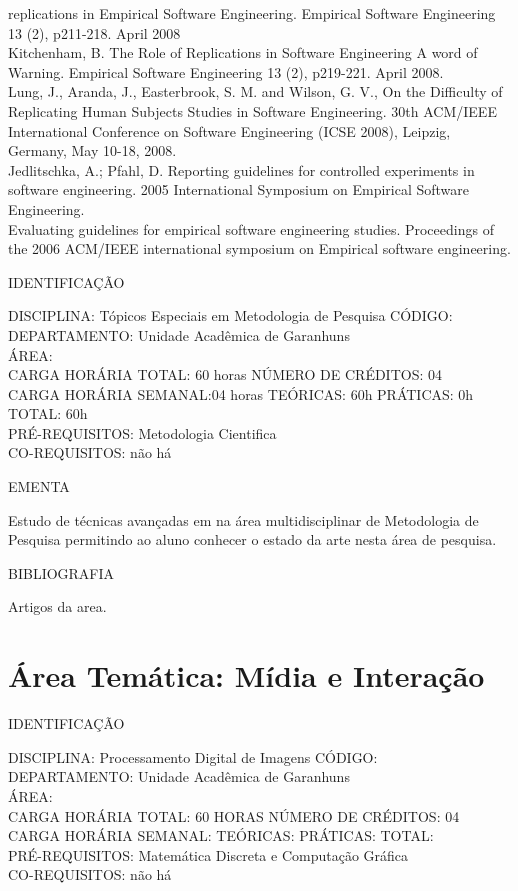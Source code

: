 \documentclass[
	12pt,				%
	openright,			%
  oneside,     %
	a4paper,			%
	chapter=TITLE,		%
	english,			%
	french,				%
	spanish,			%
	brazil				%
	]{abntex2}
\begin{document}
\begin{apendicesenv}
replications in Empirical Software Engineering. Empirical Software
Engineering 13 (2), p211-218. April 2008 \\
Kitchenham, B. The Role of Replications in Software Engineering  A
word of Warning. Empirical Software Engineering 13 (2), p219-221. April
2008.\\
Lung, J., Aranda, J., Easterbrook, S. M. and Wilson, G. V., On the
Difficulty of Replicating Human Subjects Studies in Software
Engineering. 30th ACM/IEEE International Conference on Software
Engineering (ICSE 2008), Leipzig, Germany, May 10-18,
2008.\\
Jedlitschka, A.; Pfahl, D. Reporting guidelines for controlled
experiments in software engineering. 2005 International Symposium on
Empirical Software Engineering.\\
Evaluating guidelines for empirical software engineering studies.
Proceedings of the 2006 ACM/IEEE international symposium on Empirical
software engineering.

\newpage IDENTIFICAÇÃO

DISCIPLINA: Tópicos Especiais em Metodologia de Pesquisa CÓDIGO: \\
DEPARTAMENTO: Unidade Acadêmica de Garanhuns \\
ÁREA: \\
CARGA HORÁRIA TOTAL: 60 horas NÚMERO DE CRÉDITOS: 04\\
CARGA HORÁRIA SEMANAL:04 horas TEÓRICAS: 60h PRÁTICAS: 0h TOTAL: 60h\\
PRÉ-REQUISITOS: Metodologia Cientifica\\
CO-REQUISITOS: não há

EMENTA 

Estudo de técnicas avançadas em na área multidisciplinar de Metodologia
de Pesquisa permitindo ao aluno conhecer o estado da arte nesta área de
pesquisa.

BIBLIOGRAFIA 

Artigos da area.
\newpage

\section*{Área Temática: Mídia e Interação}

IDENTIFICAÇÃO

DISCIPLINA: Processamento Digital de Imagens CÓDIGO:\\ 
DEPARTAMENTO: Unidade Acadêmica de Garanhuns\\
ÁREA: \\
CARGA HORÁRIA TOTAL: 60 HORAS NÚMERO DE CRÉDITOS: 04\\
CARGA HORÁRIA SEMANAL: TEÓRICAS: PRÁTICAS: TOTAL: \\
PRÉ-REQUISITOS: Matemática Discreta e Computação Gráfica\\
CO-REQUISITOS: não há


\end{apendicesenv}
\end{document}
